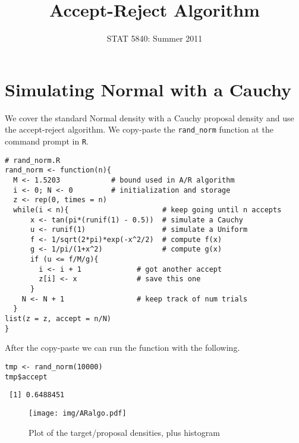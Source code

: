 \documentclass[11pt,english]{article}
\title{Accept-Reject Algorithm}
\date{STAT 5840: Summer 2011}
\begin{document}
\maketitle

\thispagestyle{empty}

\section*{Simulating Normal with a Cauchy}
\label{sec-1}

We cover the standard Normal density with a Cauchy proposal density and use the accept-reject algorithm.  We copy-paste the \texttt{rand\_norm} function at the command prompt in \texttt{R}.

\begin{verbatim}
# rand_norm.R
rand_norm <- function(n){
  M <- 1.5203            # bound used in A/R algorithm
  i <- 0; N <- 0         # initialization and storage
  z <- rep(0, times = n)
  while(i < n){                      # keep going until n accepts
      x <- tan(pi*(runif(1) - 0.5))  # simulate a Cauchy
      u <- runif(1)                  # simulate a Uniform
      f <- 1/sqrt(2*pi)*exp(-x^2/2)  # compute f(x)
      g <- 1/pi/(1+x^2)              # compute g(x)
      if (u <= f/M/g){
        i <- i + 1             # got another accept
        z[i] <- x              # save this one
      }
    N <- N + 1                 # keep track of num trials
  }
list(z = z, accept = n/N)                     
}
\end{verbatim}
After the copy-paste we can run the function with the following.
\begin{verbatim}
tmp <- rand_norm(10000)
tmp$accept
\end{verbatim}

\begin{verbatim}
 [1] 0.6488451
\end{verbatim}



\begin{figure}[h!]
\centering
\texttt{[image: img/ARalgo.pdf]}
\caption{\label{fig:yplot}Plot of the target/proposal densities, plus histogram}
\end{figure}
\end{document}
